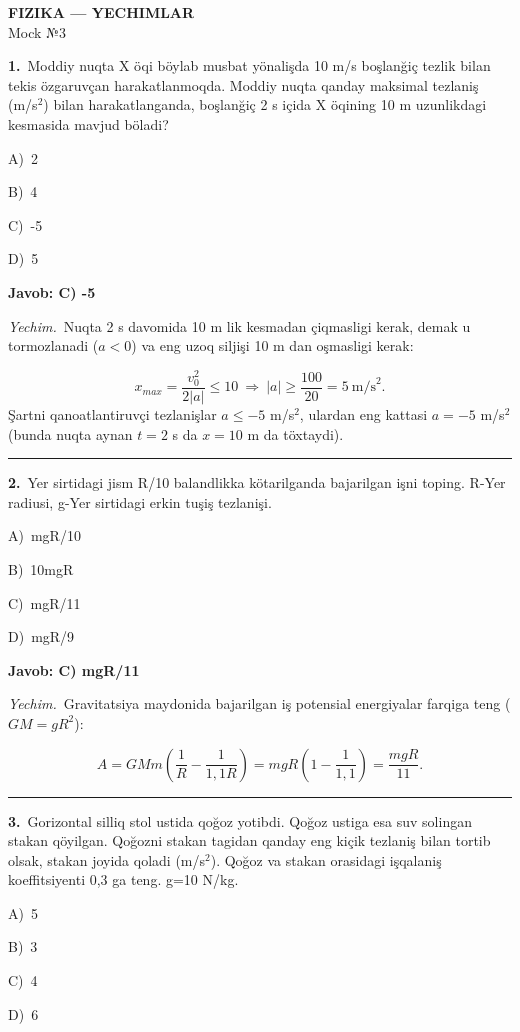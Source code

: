 \documentclass[11pt,a4paper]{article}
\newcommand{\opt}[2]{\hspace*{4mm}#1)\ #2\par}
\begin{document}
\begin{center}{\Large\textbf{FIZIKA — YECHIMLAR}}\\[2pt]{\large Mock №3}\end{center}
\noindent\begin{minipage}{\linewidth}
\textbf{1.}\ Moddiy nuqta X öqi böylab musbat yönalişda 10 m/s boşlanğiç tezlik bilan tekis özgaruvçan harakatlanmoqda. Moddiy nuqta qanday maksimal tezlaniş (m/s$^{2}$) bilan harakatlanganda, boşlanğiç 2 s içida X öqining 10 m uzunlikdagi kesmasida mavjud böladi?\par\smallskip
\opt{A}{2}
\opt{B}{4}
\opt{C}{-5}
\opt{D}{5}
\end{minipage}\vspace{2pt}\par
\noindent\colorbox{gray!12}{\parbox{\dimexpr\linewidth-2\fboxsep}{\textbf{Javob: C) -5}}}\par\smallskip
\noindent\textit{Yechim.}\ Nuqta 2 s davomida 10 m lik kesmadan çiqmasligi kerak, demak u tormozlanadi ($a<0$) va eng uzoq siljişi 10 m dan oşmasligi kerak:\par
\[x_{max}=\frac{v_0^2}{2|a|}\le10\ \Rightarrow\ |a|\ge\frac{100}{20}=5\ \text{m/s}^2.\]
Şartni qanoatlantiruvçi tezlanişlar $a\le-5$ m/s$^2$, ulardan eng kattasi $a=-5$ m/s$^2$ (bunda nuqta aynan $t=2$ s da $x=10$ m da töxtaydi).\par\par\medskip\hrule\medskip
{}\noindent\begin{minipage}{\linewidth}
\textbf{2.}\ Yer sirtidagi jism R/10 balandlikka kötarilganda bajarilgan işni toping. R-Yer radiusi, g-Yer sirtidagi erkin tuşiş tezlanişi.\par\smallskip
\opt{A}{mgR/10}
\opt{B}{10mgR}
\opt{C}{mgR/11}
\opt{D}{mgR/9}
\end{minipage}\vspace{2pt}\par
\noindent\colorbox{gray!12}{\parbox{\dimexpr\linewidth-2\fboxsep}{\textbf{Javob: C) mgR/11}}}\par\smallskip
\noindent\textit{Yechim.}\ Gravitatsiya maydonida bajarilgan iş potensial energiyalar farqiga teng ($GM=gR^2$):\par
\[A=GMm\left(\frac1R-\frac{1}{1{,}1R}\right)=mgR\left(1-\frac{1}{1{,}1}\right)=\frac{mgR}{11}.\]\par\medskip\hrule\medskip
{}\noindent\begin{minipage}{\linewidth}
\textbf{3.}\ Gorizontal silliq stol ustida qoğoz yotibdi. Qoğoz ustiga esa suv solingan stakan qöyilgan. Qoğozni stakan tagidan qanday eng kiçik tezlaniş bilan tortib olsak, stakan joyida qoladi (m/s$^{2}$). Qoğoz va stakan orasidagi işqalaniş koeffitsiyenti 0,3 ga teng. g=10 N/kg.\par\smallskip
\opt{A}{5}
\opt{B}{3}
\opt{C}{4}
\opt{D}{6}
\end{minipage}\vspace{2pt}\par
\end{document}
